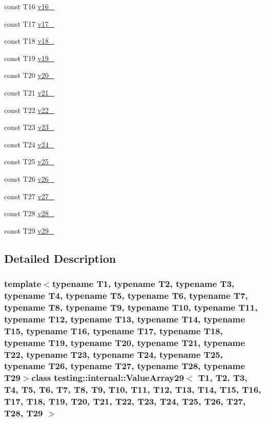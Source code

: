\begin{DoxyCompactItemize}
\item 
const \-T16 \hyperlink{classtesting_1_1internal_1_1ValueArray29_a8b2b80d31925c1583c3e694d2bf235c5}{v16\-\_\-}
\item 
const \-T17 \hyperlink{classtesting_1_1internal_1_1ValueArray29_a9f59ea9e6f3642f77227dd1f7882d649}{v17\-\_\-}
\item 
const \-T18 \hyperlink{classtesting_1_1internal_1_1ValueArray29_ad07972ee98135c8deb090fc891a04e3e}{v18\-\_\-}
\item 
const \-T19 \hyperlink{classtesting_1_1internal_1_1ValueArray29_a3ad77b5b43c14332dabc9d47c8907e7f}{v19\-\_\-}
\item 
const \-T20 \hyperlink{classtesting_1_1internal_1_1ValueArray29_adb43992f7b5f5f07e0187003b8c9c872}{v20\-\_\-}
\item 
const \-T21 \hyperlink{classtesting_1_1internal_1_1ValueArray29_a80089b2eaa99efb5d3559378fbdac426}{v21\-\_\-}
\item 
const \-T22 \hyperlink{classtesting_1_1internal_1_1ValueArray29_aeec4c711a4f7cf166e6a2646aa7d0bc7}{v22\-\_\-}
\item 
const \-T23 \hyperlink{classtesting_1_1internal_1_1ValueArray29_a7f672a4a694f749a8b6119bff7705a66}{v23\-\_\-}
\item 
const \-T24 \hyperlink{classtesting_1_1internal_1_1ValueArray29_a6c10a180ac97815f7d3f4522507e91ca}{v24\-\_\-}
\item 
const \-T25 \hyperlink{classtesting_1_1internal_1_1ValueArray29_a26cfe8143447970e30441924be04bf08}{v25\-\_\-}
\item 
const \-T26 \hyperlink{classtesting_1_1internal_1_1ValueArray29_a26c3ac1aaf85c25e014a5001cfecb4c5}{v26\-\_\-}
\item 
const \-T27 \hyperlink{classtesting_1_1internal_1_1ValueArray29_aee0cd82b89da8c22b3d49e9beea5f0a4}{v27\-\_\-}
\item 
const \-T28 \hyperlink{classtesting_1_1internal_1_1ValueArray29_a70009fbc6bb95bda68add912f5116104}{v28\-\_\-}
\item 
const \-T29 \hyperlink{classtesting_1_1internal_1_1ValueArray29_af5743c2e9de580ce4416c299770416a1}{v29\-\_\-}
\end{DoxyCompactItemize}


\subsection{\-Detailed \-Description}
\subsubsection*{template$<$typename T1, typename T2, typename T3, typename T4, typename T5, typename T6, typename T7, typename T8, typename T9, typename T10, typename T11, typename T12, typename T13, typename T14, typename T15, typename T16, typename T17, typename T18, typename T19, typename T20, typename T21, typename T22, typename T23, typename T24, typename T25, typename T26, typename T27, typename T28, typename T29$>$class testing\-::internal\-::\-Value\-Array29$<$ T1, T2, T3, T4, T5, T6, T7, T8, T9, T10, T11, T12, T13, T14, T15, T16, T17, T18, T19, T20, T21, T22, T23, T24, T25, T26, T27, T28, T29 $>$}



